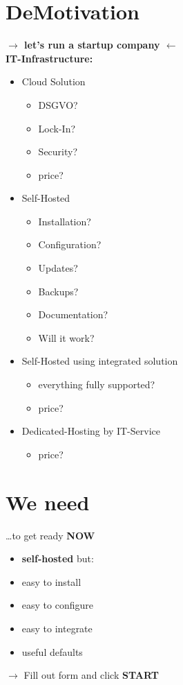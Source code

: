 \documentclass{beamer}
\begin{document}
	\section*{DeMotivation}
	\begin{frame}{\insertsection}{\insertsubsection}
		\vspace{-0.5cm}
		\textbf{$\rightarrow$ let's run a startup company $\leftarrow$}\\
		\textbf{IT-Infrastructure:}
		\begin{itemize}
			\item Cloud Solution
			\begin{itemize}
				\item DSGVO?
				\item Lock-In?
				\item Security?
				\item price?
			\end{itemize}
			\item Self-Hosted
			\begin{itemize}
				\item Installation?
				\item Configuration?
				\item Updates?
				\item Backups?
				\item Documentation?
				\item Will it work?
			\end{itemize}
			\item Self-Hosted using integrated solution
			\begin{itemize}
				\item everything fully supported?
				\item price?
			\end{itemize}
			\item Dedicated-Hosting by IT-Service
			\begin{itemize}
				\item price?
			\end{itemize}
		\end{itemize}
	\end{frame}
	
\section{We need}
	\begin{frame}{\insertsection}{\insertsubsection}
		\vspace{-0.5cm}
		
		\dots to get ready \textbf{NOW}
		
		\begin{itemize}
			\item \textbf{self-hosted} but:
			\item easy to install
			\item easy to configure
			\item easy to integrate
			\item useful defaults 
		\end{itemize}
		$\rightarrow$ Fill out form and click \textbf{START}
	\end{frame}
\end{document}
